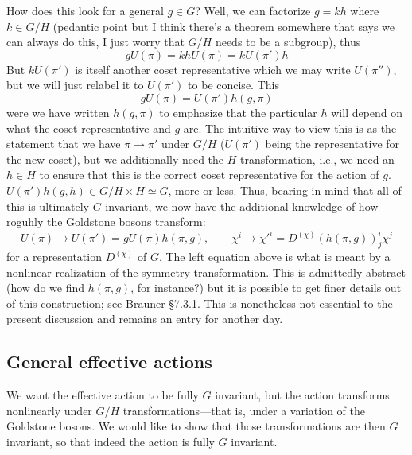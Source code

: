 \documentclass{report}
\begin{document}
How does this look for a general $ g \in G$? Well, we can factorize 
$ g = k h$ where $ k \in G/H $ (pedantic point but I think there's a
theorem somewhere that says we can always do this, I just worry that $ G/H $
needs to be a subgroup), thus \begin{equation*}
	gU(\pi) = kh U(\pi) = k U(\pi')h
\end{equation*}
But $ kU(\pi') $ is itself another coset representative which we may write 
$ U(\pi'') $, but we will just relabel it to $ U(\pi') $ to be concise. 
This 
\begin{equation*}
	gU(\pi) = U(\pi')h(g,\pi)
\end{equation*}
were we have written $ h(g,\pi) $ to emphasize that the particular $ h $ will 
depend on what the coset representative and $ g $ are. The intuitive way to 
view this is as the statement that we have $ \pi\to \pi' $ under $ G/H $ ($ U(\pi') $
being the representative for the new coset), but we additionally need the 
$ H $ transformation, i.e., we need an $ h \in H$ to ensure that this is the 
correct coset representative for the action of $ g $. $ U(\pi') h(g,h)\in 
G/H \times H \simeq G $, more or less. Thus, bearing in mind that all of this 
is ultimately $ G $-invariant, we now have the additional knowledge of how 
roguhly the Goldstone bosons transform: 
\begin{equation*}
	U(\pi) \to U(\pi') = gU(\pi) h(\pi, g),\qquad 
	\chi^i \to \chi'^i = D^{(\chi)}(h(\pi, g))^i_j \chi^j
\end{equation*}
for a representation $ D^{(\chi)} $ of $ G $. The left equation above is what is 
meant by a nonlinear realization of the symmetry transformation. This is admittedly 
abstract (how do we find $ h(\pi,g) $, for instance?) but it is possible to 
get finer details out of this construction; see Brauner \S 7.3.1. This is 
nonetheless not essential to the present discussion and remains an entry for 
another day.

\subsection{General effective actions}

We want the effective action to be fully $ G $ invariant, but the action transforms 
nonlinearly under $ G/H $ transformations---that is, under a variation of the 
Goldstone bosons. We would like to show that those transformations are then 
$ G $ invariant, so that indeed the action is fully $ G $ invariant.
\end{document}
